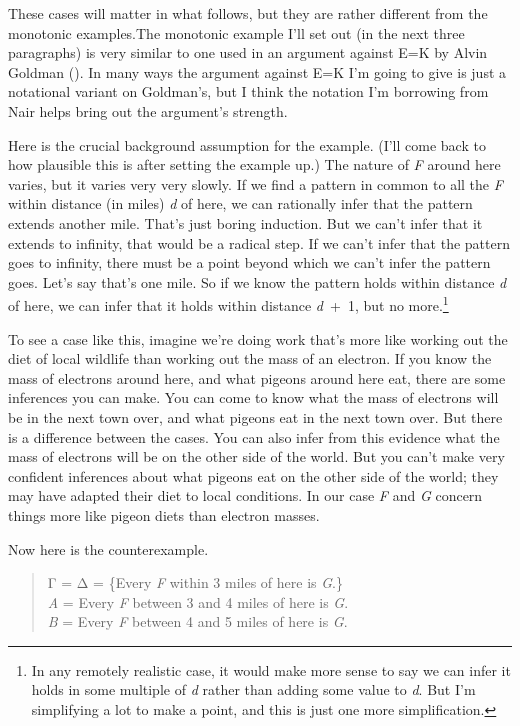 \documentclass[
  10pt,
  letterpaper,
  twoside]{scrbook}
\begin{document}
These cases will matter in what follows, but they are rather different
from the monotonic examples.The monotonic example I'll set out (in the
next three paragraphs) is very similar to one used in an argument
against E=K by Alvin Goldman (). In many
ways the argument against E=K I'm going to give is just a notational
variant on Goldman's, but I think the notation I'm borrowing from Nair
helps bring out the argument's strength.

Here is the crucial background assumption for the example. (I'll come
back to how plausible this is after setting the example up.) The nature
of \emph{F} around here varies, but it varies very very slowly. If we
find a pattern in common to all the \emph{F} within distance (in miles)
\emph{d} of here, we can rationally infer that the pattern extends
another mile. That's just boring induction. But we can't infer that it
extends to infinity, that would be a radical step. If we can't infer
that the pattern goes to infinity, there must be a point beyond which we
can't infer the pattern goes. Let's say that's one mile. So if we know
the pattern holds within distance \emph{d} of here, we can infer that it
holds within distance \emph{d}~+~1, but no more.\footnote{In any
  remotely realistic case, it would make more sense to say we can infer
  it holds in some multiple of \emph{d} rather than adding some value to
  \emph{d}. But I'm simplifying a lot to make a point, and this is just
  one more simplification.}

To see a case like this, imagine we're doing work that's more like
working out the diet of local wildlife than working out the mass of an
electron. If you know the mass of electrons around here, and what
pigeons around here eat, there are some inferences you can make. You can
come to know what the mass of electrons will be in the next town over,
and what pigeons eat in the next town over. But there is a difference
between the cases. You can also infer from this evidence what the mass
of electrons will be on the other side of the world. But you can't make
very confident inferences about what pigeons eat on the other side of
the world; they may have adapted their diet to local conditions. In our
case \emph{F} and \emph{G} concern things more like pigeon diets than
electron masses.

Now here is the counterexample.

\begin{quote}
Γ = Δ = \{Every \emph{F} within 3 miles of here is \emph{G}.\}\\
\emph{A} = Every \emph{F} between 3 and 4 miles of here is \emph{G}.\\
\emph{B} = Every \emph{F} between 4 and 5 miles of here is \emph{G}.
\end{quote}
\end{document}
